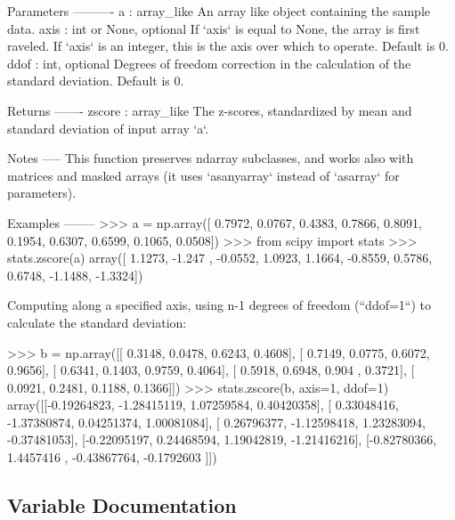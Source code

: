 \begin{DoxyVerb}
\begin{DoxyVerb}
Parameters
----------
a : array_like
    An array like object containing the sample data.
axis : int or None, optional
    If `axis` is equal to None, the array is first raveled. If `axis` is
    an integer, this is the axis over which to operate. Default is 0.
ddof : int, optional
    Degrees of freedom correction in the calculation of the
    standard deviation. Default is 0.

Returns
-------
zscore : array_like
    The z-scores, standardized by mean and standard deviation of input
    array `a`.

Notes
-----
This function preserves ndarray subclasses, and works also with
matrices and masked arrays (it uses `asanyarray` instead of `asarray`
for parameters).

Examples
--------
>>> a = np.array([ 0.7972,  0.0767,  0.4383,  0.7866,  0.8091,  0.1954,
                   0.6307, 0.6599,  0.1065,  0.0508])
>>> from scipy import stats
>>> stats.zscore(a)
array([ 1.1273, -1.247 , -0.0552,  1.0923,  1.1664, -0.8559,  0.5786,
        0.6748, -1.1488, -1.3324])

Computing along a specified axis, using n-1 degrees of freedom (``ddof=1``)
to calculate the standard deviation:

>>> b = np.array([[ 0.3148,  0.0478,  0.6243,  0.4608],
                  [ 0.7149,  0.0775,  0.6072,  0.9656],
                  [ 0.6341,  0.1403,  0.9759,  0.4064],
                  [ 0.5918,  0.6948,  0.904 ,  0.3721],
                  [ 0.0921,  0.2481,  0.1188,  0.1366]])
>>> stats.zscore(b, axis=1, ddof=1)
array([[-0.19264823, -1.28415119,  1.07259584,  0.40420358],
       [ 0.33048416, -1.37380874,  0.04251374,  1.00081084],
       [ 0.26796377, -1.12598418,  1.23283094, -0.37481053],
       [-0.22095197,  0.24468594,  1.19042819, -1.21416216],
       [-0.82780366,  1.4457416 , -0.43867764, -0.1792603 ]])
\end{DoxyVerb}
 

\subsection{Variable Documentation}
\hypertarget{namespacescipy_1_1stats_1_1stats_af64e57aacdbdd2800961c4f1ab76adb7}{}

\end{DoxyVerb}
